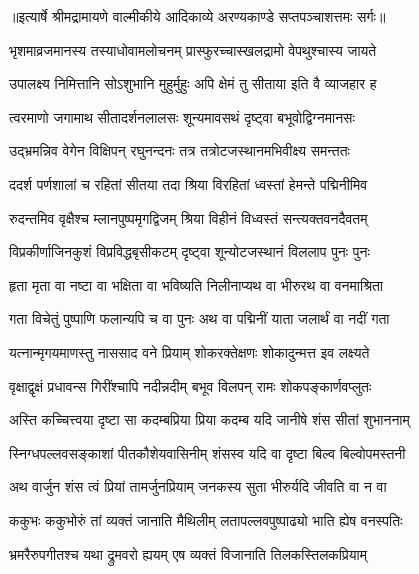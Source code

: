 {॥इत्यार्षे श्रीमद्रामायणे वाल्मीकीये आदिकाव्ये अरण्यकाण्डे सप्तपञ्चाशत्तमः सर्गः॥}


\twolineshloka
{भृशमाव्रजमानस्य तस्याधोवामलोचनम्}
{प्रास्फुरच्चास्खलद्रामो वेपथुश्चास्य जायते} %

\twolineshloka
{उपालक्ष्य निमित्तानि सोऽशुभानि मुहुर्मुहुः}
{अपि क्षेमं तु सीताया इति वै व्याजहार ह} %

\twolineshloka
{त्वरमाणो जगामाथ सीतादर्शनलालसः}
{शून्यमावसथं दृष्ट्वा बभूवोद्विग्नमानसः} %

\twolineshloka
{उद्भ्रमन्निव वेगेन विक्षिपन् रघुनन्दनः}
{तत्र तत्रोटजस्थानमभिवीक्ष्य समन्ततः} %

\twolineshloka
{ददर्श पर्णशालां च रहितां सीतया तदा}
{श्रिया विरहितां ध्वस्तां हेमन्ते पद्मिनीमिव} %

\twolineshloka
{रुदन्तमिव वृक्षैश्च म्लानपुष्पमृगद्विजम्}
{श्रिया विहीनं विध्वस्तं सन्त्यक्तवनदैवतम्} %

\twolineshloka
{विप्रकीर्णाजिनकुशं विप्रविद्धबृसीकटम्}
{दृष्ट्वा शून्योटजस्थानं विललाप पुनः पुनः} %

\twolineshloka
{हृता मृता वा नष्टा वा भक्षिता वा भविष्यति}
{निलीनाप्यथ वा भीरुरथ वा वनमाश्रिता} %

\twolineshloka
{गता विचेतुं पुष्पाणि फलान्यपि च वा पुनः}
{अथ वा पद्मिनीं याता जलार्थं वा नदीं गता} %

\twolineshloka
{यत्नान्मृगयमाणस्तु नाससाद वने प्रियाम्}
{शोकरक्तेक्षणः शोकादुन्मत्त इव लक्ष्यते} %

\twolineshloka
{वृक्षाद्वृक्षं प्रधावन्स गिरींश्चापि नदीन्नदीम्}
{बभूव विलपन् रामः शोकपङ्कार्णवप्लुतः} %

\twolineshloka
{अस्ति कच्चित्त्वया दृष्टा सा कदम्बप्रिया प्रिया}
{कदम्ब यदि जानीषे शंस सीतां शुभाननाम्} %

\twolineshloka
{स्निग्धपल्लवसङ्काशां पीतकौशेयवासिनीम्}
{शंसस्व यदि वा दृष्टा बिल्व बिल्वोपमस्तनी} %

\twolineshloka
{अथ वार्जुन शंस त्वं प्रियां तामर्जुनप्रियाम्}
{जनकस्य सुता भीरुर्यदि जीवति वा न वा} %

\twolineshloka
{ककुभः ककुभोरुं तां व्यक्तं जानाति मैथिलीम्}
{लतापल्लवपुष्पाढ्यो भाति ह्येष वनस्पतिः} %

\twolineshloka
{भ्रमरैरुपगीतश्च यथा द्रुमवरो ह्ययम्}
{एष व्यक्तं विजानाति तिलकस्तिलकप्रियाम्} %

